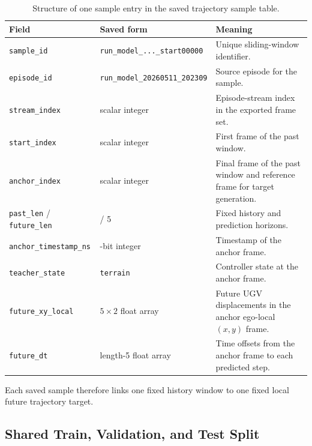 \begin{table}[tbp]
    \caption{Structure of one sample entry in the saved trajectory sample table.}
    \label{tab:sample_record_structure}
    \centering
    \small
    \setlength{\tabcolsep}{4pt}
    \renewcommand{\arraystretch}{1.15}
    \begin{tabularx}{\textwidth}{@{}>{\raggedright\arraybackslash}p{}>{\raggedright\arraybackslash}p{}X@{}}
        \toprule
        \textbf{Field} & \textbf{Saved form} & \textbf{Meaning} \\
        \midrule
        \texttt{sample\_id} & \texttt{run\_model\_...\_start00000} & Unique sliding-window identifier. \\
        \texttt{episode\_id} & \texttt{run\_model\_20260511\_202309} & Source episode for the sample. \\
        \texttt{stream\_index} & scalar integer & Episode-stream index in the exported frame set. \\
        \texttt{start\_index} & scalar integer & First frame of the past window. \\
        \texttt{anchor\_index} & scalar integer & Final frame of the past window and reference frame for target generation. \\
        \texttt{past\_len} / \texttt{future\_len} & 10 / 5 & Fixed history and prediction horizons. \\
        \texttt{anchor\_timestamp\_ns} & 64-bit integer & Timestamp of the anchor frame. \\
        \texttt{teacher\_state} & \texttt{terrain} & Controller state at the anchor frame. \\
        \texttt{future\_xy\_local} & $5 \times 2$ float array & Future UGV displacements in the anchor ego-local $(x,y)$ frame. \\
        \texttt{future\_dt} & length-5 float array & Time offsets from the anchor frame to each predicted step. \\
        \bottomrule
    \end{tabularx}
\end{table}

Each saved sample therefore links one fixed history window to one fixed local future trajectory target.

\subsection{Shared Train, Validation, and Test Split}

